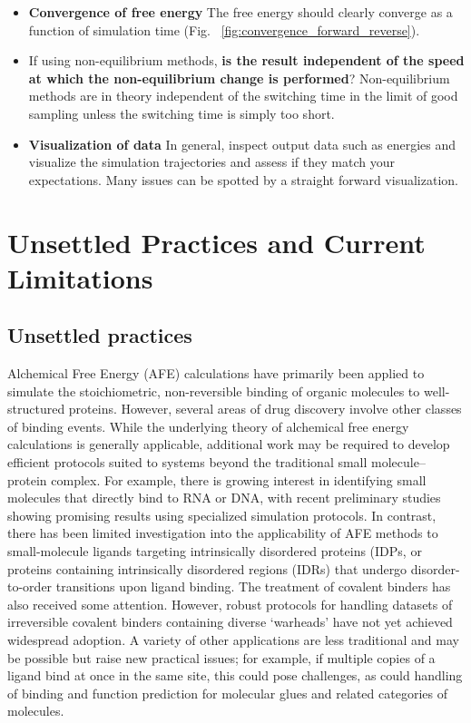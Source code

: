 \documentclass[9pt,bestpractices]{livecoms}
\begin{document}
\begin{itemize}
\item \textbf{Convergence of free energy} The free energy should clearly converge as a function of simulation time (Fig. ~\ref{fig:convergence_forward_reverse}).
\item If using non-equilibrium methods, \textbf{is the result independent of the speed at which the non-equilibrium change is performed}? Non-equilibrium methods are in theory independent of the switching time in the limit of good sampling unless the switching time is simply too short. 
\item \textbf{Visualization of data} In general, inspect output data such as energies and visualize the simulation trajectories and assess if they match your expectations. Many issues can be spotted by a straight forward visualization. 
\end{itemize}


\section{Unsettled Practices and Current Limitations}
\label{sec:unsettled}

\subsection{Unsettled practices}

Alchemical Free Energy (AFE) calculations have primarily been applied to simulate the stoichiometric, non-reversible binding of organic molecules to well-structured proteins. However, several areas of drug discovery involve other classes of binding events. While the underlying theory of alchemical free energy calculations is generally applicable, additional work may be required to develop efficient protocols suited to systems beyond the traditional small molecule–protein complex.
For example, there is growing interest in identifying small molecules that directly bind to RNA or DNA, with recent preliminary studies showing promising results using specialized simulation protocols.\cite{Abramyan2025,Rasouli2024} In contrast, there has been limited investigation into the applicability of AFE methods to small-molecule ligands targeting intrinsically disordered proteins (IDPs,\cite{Papadourakis2024} or proteins containing intrinsically disordered regions (IDRs) that undergo disorder-to-order transitions upon ligand binding.\cite{MendozaMartinez2022}
The treatment of covalent binders has also received some attention.\cite{luo2021,zhang2019} However, robust protocols for handling datasets of irreversible covalent binders containing diverse ‘warheads’ have not yet achieved widespread adoption.\cite{Yu2019} A variety of other applications are less traditional and may be possible but raise new practical issues; for example, if multiple copies of a ligand bind at once in the same site, this could pose challenges, as could handling of binding and function prediction for molecular glues and related categories of molecules. 
\end{document}
